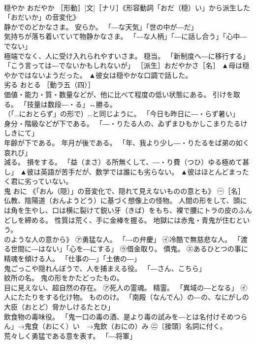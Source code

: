\documentclass[8pt]{extreport}
\begin{document}
\begin{CJK}{UTF8}{min}
\\	穏やか	おだやか	［形動］[文]［ナリ］《形容動詞「おだ（穏）い」から派生した「おだいか」の音変化》 
\\	静かでのどかなさま。 安らか。 「―な天気」「世の中が―だ」 
\\	気持ちが落ち着いていて物静かなさま。 「―な人柄」「―に話し合う」「心中―でない」 
\\	極端でなく、人に受け入れられやすいさま。 穏当。 「新制度へ―に移行する」「こう言っては―でないかもしれないが」 ［派生］おだやかさ［名］	▲母は穏やかではないようだった。 ▲彼女は穏やかな口調で話した。
\\	劣る	おとる	［動ラ五（四）］ 
\\	価値・能力・質・数量などが、他に比べて程度の低い状態にある。 引けを取る。 「技量は数段―・る」↔勝る。 
\\	（「…におとらず」の形で）…と同じように。 「今日も昨日に―・らず暑い」 
\\	身分・階級などが下である。 「―・りたる人の、ゐずまひもかしこまりたるけしきにて」 
\\	年齢が下である。 年月が後である。 「年、我より少し―・りたるをば弟の如く哀れび」 
\\	減る。 損をする。 「益（まさ）る所無くして、―・り費（つひ）ゆる極めて甚し」	▲彼は英語が苦手だが、数学では誰にも劣らない。 ▲彼はほとんどまったく君に劣っていない。
\\	鬼	おに	《「おん（隠）」の音変化で、隠れて見えないものの意とも》 ㊀［名］ 
\\	仏教、陰陽道（おんようどう）に基づく想像上の怪物。 人間の形をして、頭には角を生やし、口は横に裂けて鋭い牙（きば）をもち、裸で腰にトラの皮のふんどしを締める。 性質は荒く、手に金棒を握る。 地獄には赤鬼・青鬼が住むという。 
\\	のような人の意から》 ㋐勇猛な人。 「―の弁慶」 ㋑冷酷で無慈悲な人。 「渡る世間に―はない」「心を―にする」 ㋒借金取り。 債鬼。 ㋓あるひとつの事に精魂を傾ける人。 「仕事の―」「土俵の―」 
\\	鬼ごっこや隠れんぼうで、人を捕まえる役。 「―さん、こちら」 
\\	紋所の名。 鬼の形をかたどったもの。 
\\	目に見えない、超自然の存在。 ㋐死人の霊魂。 精霊。 「異域の―となる」 ㋑人にたたりをする化け物。 もののけ。 「南殿（なんでん）の―の、なにがしの大臣（おとど）脅かしけるたとひ」 
\\	飲食物の毒味役。 「鬼一口の毒の酒、是より毒の試みを―とは名付けそめつらん」→鬼食（おにく）い　→鬼飲（おにの）み ㊁〔接頭〕名詞に付く。 
\\	荒々しく勇猛である意を表す。 「―将軍」 

\end{CJK}
\end{document}
